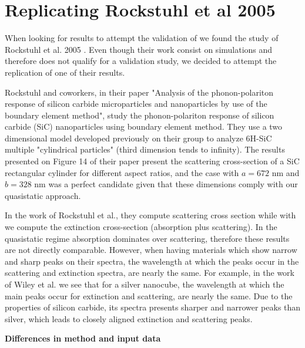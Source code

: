 
\section{Replicating Rockstuhl et al 2005} \label{chap:rep_rockstuhl}
\graphicspath{{replication_validation/figs/}}

When looking for results to attempt the validation of \pygbe we found the study of Rockstuhl et al. 2005 \cite{rockstuhl2005}. 
Even though their work consist on simulations and therefore does not qualify for a validation study, we decided to 
attempt the replication of one of their results. 

Rockstuhl and coworkers, in their paper "Analysis of the phonon-polariton response of silicon carbide microparticles 
and nanoparticles by use of the boundary element method", study the phonon-polariton response of silicon carbide (SiC)
nanoparticles using boundary element method. They use a two dimensional model developed previously on their group \cite{rockstuhl2003}
to analyze 6H-SiC multiple "cylindrical particles" (third dimension tends to infinity). The results presented on Figure 14 of their paper  
present the scattering cross-section of a SiC rectangular cylinder for different aspect ratios, and the case with $a = 672$ nm and $b = 328$ nm
was a perfect candidate given that these dimensions comply with our quasistatic approach.

In the work of Rockstuhl et al., they compute scattering cross section while with \pygbe we compute the extinction cross-section 
(absorption plus scattering). In the quasistatic regime absorption dominates over scattering, therefore these results are not directly
comparable. However, when having materials which show narrow and sharp peaks on their spectra, the wavelength at which the peaks occur 
in the scattering and extinction spectra, are nearly the same. For example, in the work of Wiley et al. \cite{wiley-etal-2006}
we see that for a silver nanocube, the wavelength at which the main peaks occur for extinction and scattering, are nearly the same. Due to the properties 
of silicon carbide, its spectra presents sharper and narrower peaks than silver, which leads to closely aligned extinction and scattering peaks.


\textbf{Differences in method and input data}

